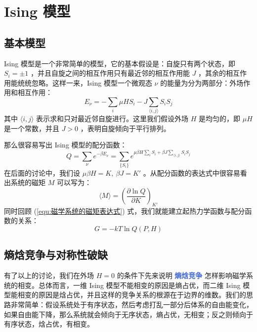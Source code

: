 \section{Ising 模型}\label{sec:Ising模型}

\subsection{基本模型}\label{sub:基本模型}

Ising 模型是一个非常简单的模型，它的基本假设是：自旋只有两个状态，即 $S_i = \pm 1$ ，并且自旋之间的相互作用只有最近邻的相互作用能 $J$ ，其余的相互作用能统统忽略。这样一来，Ising 模型一个微观态 $\nu$ 的能量为分为两部分：外场作用和相互作用：
\begin{equation}\label{equ:Ising模型的哈密顿量}
    E_\nu = - \sum_i \mu H S_i-J \sum_{\langle i,j \rangle} S_i S_j
\end{equation}
其中 $\langle i,j \rangle$ 表示求和只对最近邻自旋进行。这里我们假设外场 $H$ 是均匀的，即 $\mu H$ 是一个常数，并且 $J>0$ ，表明自旋倾向于平行排列。

那么很容易写出 Ising 模型的配分函数：
\begin{equation}\label{equ:Ising模型的配分函数}
    Q = \sum_\nu e^{-\beta E_\nu} = \sum_{\{S_i\}} e^{\mu \beta H \sum_i  S_i + \beta J \sum_{\langle i,j \rangle} S_i S_j}
\end{equation}
在后面的讨论中，我们设 $\mu\beta H = K, ~\beta J = K'$ 。从配分函数的表达式中很容易看出系统的磁矩 $M$ 可以写为：
\begin{equation}\label{equ:Ising模型的磁矩表达式}
    \langle M \rangle = \left(\frac{\partial \ln Q}{\partial K}\right)_{K'}
\end{equation}
同时回顾 (\ref*{equ:磁学系统的磁矩表达式}) 式，我们就能建立起热力学函数与配分函数的关系：
\begin{equation}\label{equ:热力学函数与配分函数}
    G = -kT\ln Q(P,H)
\end{equation}

\subsection{熵焓竞争与对称性破缺}\label{sub:熵焓竞争与对称性破缺}

有了以上的讨论，我们在外场 $H  =0$ 的条件下先来说明 \textcolor{RoyalBlue}{\textbf{\kaishu 熵焓竞争}} 怎样影响磁学系统的相变。总体而言，一维 Ising 模型不能相变的原因是熵占优，而二维 Ising 模型能相变的原因是焓占优，并且这样的竞争关系的根源在于边界的维数。我们的思路非常简单：假设系统处于有序状态，然后考虑打乱一部分后体系的自由能变化，如果自由能下降，那么系统就会倾向于无序状态，熵占优，无相变；反之则倾向于有序状态，焓占优，有相变。

